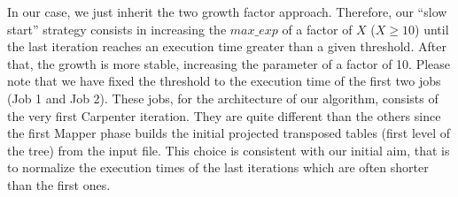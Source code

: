 In our case, we just inherit the two growth factor approach. Therefore, our ``slow start'' strategy consists in increasing the $max\_exp$ of a factor of $X$ ($X\geq10$) until the last iteration reaches an execution time greater than a given threshold. After that, the growth is more stable, increasing the parameter of a factor of 10. Please note that we have fixed the threshold to the execution time of the first two jobs (Job 1 and Job 2). These jobs, for the architecture of our algorithm, consists of the very first Carpenter iteration. They are quite different than the others since the first Mapper phase builds the initial projected transposed tables (first level of the tree) from the input file. This choice is consistent with our initial aim, that is to normalize the execution times of the last iterations which are often shorter than the first ones.

